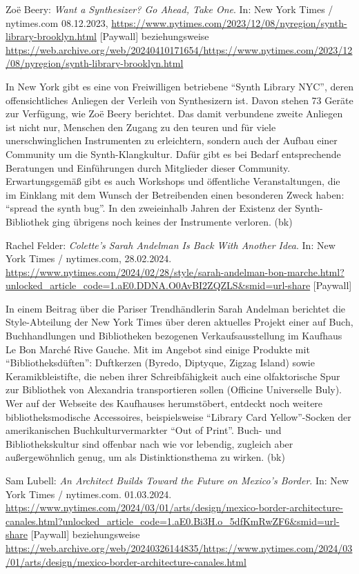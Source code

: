 \documentclass[a4paper,
fontsize=11pt,
oneside,
numbers=noperiodatend,
parskip=half-,
bibliography=totoc,
final
]{scrartcl}
\begin{document}
Zoë Beery: \emph{Want a Synthesizer? Go Ahead, Take One}. In: New York
Times / nytimes.com 08.12.2023,
\url{https://www.nytimes.com/2023/12/08/nyregion/synth-library-brooklyn.html}
{[}Paywall{]} beziehungsweise
\url{https://web.archive.org/web/20240410171654/https://www.nytimes.com/2023/12/08/nyregion/synth-library-brooklyn.html}

In New York gibt es eine von Freiwilligen betriebene \enquote{Synth
Library NYC}, deren offensichtliches Anliegen der Verleih von
Synthesizern ist. Davon stehen 73 Geräte zur Verfügung, wie Zoë Beery
berichtet. Das damit verbundene zweite Anliegen ist nicht nur, Menschen
den Zugang zu den teuren und für viele unerschwinglichen Instrumenten zu
erleichtern, sondern auch der Aufbau einer Community um die
Synth-Klangkultur. Dafür gibt es bei Bedarf entsprechende Beratungen und
Einführungen durch Mitglieder dieser Community. Erwartungsgemäß gibt es
auch Workshops und öffentliche Veranstaltungen, die im Einklang mit dem
Wunsch der Betreibenden einen besonderen Zweck haben: \enquote{spread
the synth bug}. In den zweieinhalb Jahren der Existenz der
Synth-Bibliothek ging übrigens noch keines der Instrumente verloren.
(bk)

Rachel Felder: \emph{Colette's Sarah Andelman Is Back With Another
Idea}. In: New York Times / nytimes.com, 28.02.2024.
\url{https://www.nytimes.com/2024/02/28/style/sarah-andelman-bon-marche.html?unlocked_article_code=1.aE0.DDNA.O0AvBI2ZQZLS\&smid=url-share}
{[}Paywall{]}

In einem Beitrag über die Pariser Trendhändlerin Sarah Andelman
berichtet die Style-Abteilung der New York Times über deren aktuelles
Projekt einer auf Buch, Buchhandlungen und Bibliotheken bezogenen
Verkaufsausstellung im Kaufhaus Le Bon Marché Rive Gauche. Mit im
Angebot sind einige Produkte mit \enquote{Bibliotheksdüften}: Duftkerzen
(Byredo, Diptyque, Zigzag Island) sowie Keramikbleistifte, die neben
ihrer Schreibfähigkeit auch eine olfaktorische Spur zur Bibliothek von
Alexandria transportieren sollen (Officine Universelle Buly). Wer auf
der Webseite des Kaufhauses herumstöbert, entdeckt noch weitere
bibliotheksmodische Accessoires, beispielsweise \enquote{Library Card
Yellow}-Socken der amerikanischen Buchkulturvermarkter \enquote{Out of
Print}. Buch- und Bibliothekskultur sind offenbar nach wie vor lebendig,
zugleich aber außergewöhnlich genug, um als Distinktionsthema zu wirken.
(bk)

Sam Lubell: \emph{An Architect Builds Toward the Future on Mexico's
Border}. In: New York Times / nytimes.com. 01.03.2024.
\url{https://www.nytimes.com/2024/03/01/arts/design/mexico-border-architecture-canales.html?unlocked_article_code=1.aE0.Bi3H.o_5dfKmRwZF6\&smid=url-share}
{[}Paywall{]} beziehungsweise
\url{https://web.archive.org/web/20240326144835/https://www.nytimes.com/2024/03/01/arts/design/mexico-border-architecture-canales.html}
\end{document}
